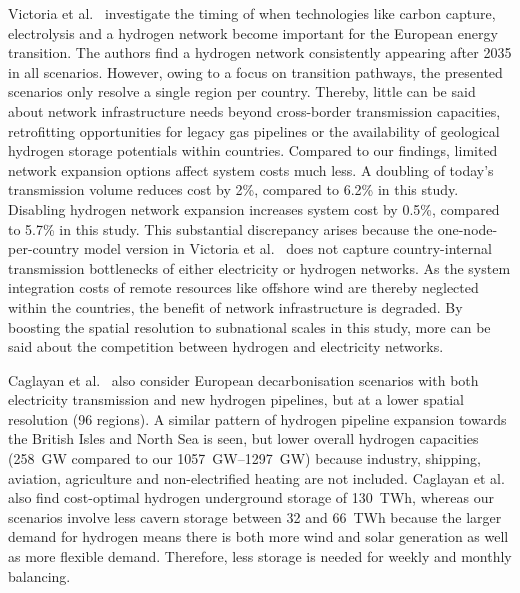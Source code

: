 Victoria et al.~\cite{victoriaSpeedTechnological2022} investigate the timing of
when technologies like carbon capture, electrolysis and a hydrogen network
become important for the European energy transition. The authors find a hydrogen
network consistently appearing after 2035 in all scenarios. However, owing to a
focus on transition pathways, the presented scenarios only resolve a single
region per country. Thereby, little can be said about network infrastructure
needs beyond cross-border transmission capacities, retrofitting opportunities
for legacy gas pipelines or the availability of geological hydrogen storage
potentials within countries. Compared to our findings, limited network expansion
options affect system costs much less. A doubling of today's transmission volume
reduces cost by 2\%, compared to 6.2\% in this study. Disabling hydrogen network
expansion increases system cost by 0.5\%, compared to 5.7\% in this study. This
substantial discrepancy arises because the one-node-per-country model version in
Victoria et al.~\cite{victoriaSpeedTechnological2022} does not capture
country-internal transmission bottlenecks of either electricity or hydrogen
networks. As the system integration costs of remote resources like offshore wind
are thereby neglected within the countries, the benefit of network
infrastructure is degraded. By boosting the spatial resolution to subnational
scales in this study, more can be said about the competition between hydrogen
and electricity networks.

Caglayan et al.~\cite{Caglayan2019} also consider European decarbonisation
scenarios with both electricity transmission and new hydrogen pipelines, but at
a lower spatial resolution (96 regions). A similar pattern of hydrogen pipeline
expansion towards the British Isles and North Sea is seen, but lower overall
hydrogen capacities (258~GW compared to our \SIrange{1057}{1297}{\giga\watt})
because industry, shipping, aviation, agriculture and non-electrified heating
are not included. Caglayan et al.~\cite{Caglayan2019} also find cost-optimal
hydrogen underground storage of 130~TWh, whereas our scenarios involve less
cavern storage between 32 and 66~TWh because the larger demand for hydrogen
means there is both more wind and solar generation as well as more flexible demand.
Therefore, less storage is needed for weekly and monthly balancing.

